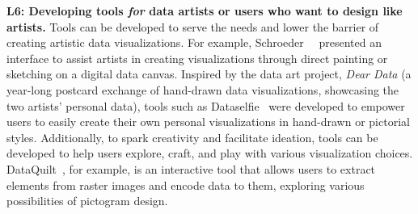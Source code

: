 \textbf{L6: Developing tools \textit{for} data artists or users who want to design like artists.}
Tools can be developed to serve the needs and lower the barrier of creating artistic data visualizations. For example, Schroeder~\etal~\cite{schroeder2015visualization} presented an interface to assist artists in creating visualizations through direct painting or sketching on a digital data canvas. Inspired by the data art project, \textit{Dear Data} (a year-long postcard exchange of hand-drawn data visualizations, showcasing the two artists' personal data), tools such as Dataselfie~\cite{kim2019dataselfie} were developed to empower users to easily create their own personal visualizations in hand-drawn or pictorial styles.
Additionally, to spark creativity and facilitate ideation, tools can be developed to help users explore, craft, and play with various visualization choices. DataQuilt~\cite{zhang2020dataquilt}, for example, is an interactive tool that allows users to extract elements from raster images and encode data to them, exploring various possibilities of pictogram design.


